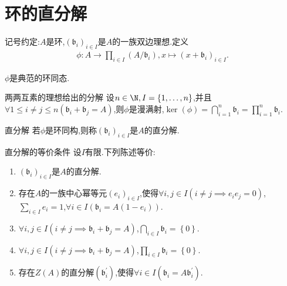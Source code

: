\section{环的直分解}

记号约定:$A$是环,$\left(\mathfrak{b}_{i}\right)_{i\in I}$是$A$的一族双边理想.定义
\begin{align*}
	\phi:A\to\prod\limits_{i\in I}\left(A/\mathfrak{b}_{i}\right),x\mapsto\left(x+\mathfrak{b}_{i}\right)_{i\in I}.
\end{align*}

\begin{proposition}{}{}
	$\phi$是典范的环同态.
\end{proposition}

\begin{proposition}{两两互素的理想给出的分解}{}
	设$n\in\N,I=\left\{1,\ldots,n\right\}$,并且$\forall 1\leq i\neq j\leq n\left(\mathfrak{b}_{i}+\mathfrak{b}_{j}=A\right)$,则$\phi$是漫满射,$\ker\left(\phi\right)=\bigcap\limits_{i=1}^{n}\mathfrak{b}_{i}=\prod\limits_{i=1}^{n}\mathfrak{b}_{i}$.
\end{proposition}

\begin{definition}{直分解}{}
	若$\phi$是环同构,则称$\left(\mathfrak{b}_{i}\right)_{i\in I}$是$A$的直分解.
\end{definition}

\begin{proposition}{直分解的等价条件}{}
	设$I$有限.下列陈述等价:
	\begin{enumerate}
		\item $\left(\mathfrak{b}_{i}\right)_{i\in I}$是$A$的直分解.
		\item 存在$A$的一族中心幂等元$\left(e_{i}\right)_{i\in I}$,使得$\forall i,j\in I\left(i\neq j\implies e_{i}e_{j}=0\right)$,$\sum\limits_{i\in I}e_{i}=1$,$\forall i\in I\left(\mathfrak{b}_{i}=A\left(1-e_{i}\right)\right)$.
		\item $\forall i,j\in I\left(i\neq j\implies\mathfrak{b}_{i}+\mathfrak{b}_{j}=A\right)$,$\bigcap\limits_{i\in I}\mathfrak{b}_{i}=\left\{0\right\}$.
		\item $\forall i,j\in I\left(i\neq j\implies\mathfrak{b}_{i}+\mathfrak{b}_{j}=A\right)$,$\prod\limits_{i\in I}\mathfrak{b}_{i}=\left\{0\right\}$.
		\item 存在$Z\left(A\right)$的直分解$\left(\mathfrak{b}_{i}^{\prime}\right)$,使得$\forall i\in I\left(\mathfrak{b}_{i}=A\mathfrak{b}_{i}^{\prime}\right)$.
	\end{enumerate}
\end{proposition}

